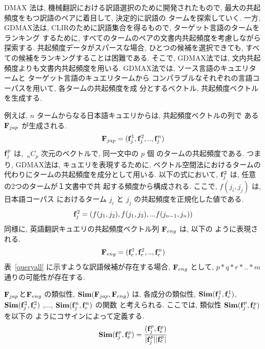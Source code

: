 DMAX 法は, 機械翻訳における訳語選択のために開発されたもので, 
最大の共起頻度をもつ訳語のペアに着目して, 決定的に訳語の
タームを探索していく. 一方, 
GDMAX法は, CLIRのために訳語集合を得るもので, ターゲット言語のタームをランキング
するために, すべてのタームのペアの文書内共起頻度を考慮しながら探索する. 
共起頻度データがスパースな場合, ひとつの候補を選択できても, 
すべての候補をランキングすることは困難である. そこで, GDMAX法では, 
文内共起頻度よりも文書内共起頻度を用いる. 
GDMAX法では, ソース言語のキュエリタームと
ターゲット言語のキュエリタームから
コンパラブルなそれぞれの言語コーパスを用いて, 各タームの共起頻度を成
分とするベクトル, 共起頻度ベクトルを生成する. 

例えば, $n$ タームからなる日本語キュエリからは, 共起頻度ベクトルの列で
ある ${\bf F}_{jap}$ が生成される. 
\begin{eqnarray*}
 {\bf F}_{jap} = ({\bf f}_{j}^{1},{\bf f}_{j}^{2},..,{\bf f}_{j}^{n})
\end{eqnarray*}
${\bf f}_{j}^{p}$ は, $~_{n}C_{p}$ 次元のベクトルで, 同一文中の $p$ 個
のタームの共起頻度である. つまり, GDMAX法は, キュエリを表現するために, 
ベクトル空間法におけるタームの代わりにタームの共起頻度を成分として用いる. 
以下の式において, ${\bf f}_{j}^{2}$ は, 任意の2つのタームが１文書中で共
起する頻度から構成される. ここで, $f(j_{i},j_{j})$ は, 日本語コーパス
におけるターム $j_{i}$ と $j_{j}$ の共起頻度を正規化した値である. 
\begin{eqnarray*}
 {\bf f}_{j}^{2} = (f(j_{1},j_{2}),f(j_{1},j_{3}),...f(j_{n-1},j_{n}))
\end{eqnarray*}
同様に, 英語翻訳キュエリの共起頻度ベクトル列 ${\bf F}_{eng}$ は, 以下の
ように表現される.  
\begin{eqnarray*}
 {\bf F}_{eng} = ({\bf f}_{e}^{1},{\bf f}_{e}^{2},..,{\bf f}_{e}^{n})
\end{eqnarray*}
表~\ref{queryall} に示すような訳語候補が存在する場合, 
${\bf F}_{eng}$ として, $p*q*r*..*m$ 通りの可能性が存在する. 

${\bf F}_{jap}$と${\bf F}_{eng}$ の類似性, ${\bf Sim}({\bf
F}_{jap},{\bf F}_{eng})$ は, 各成分の類似性, ${\bf Sim}({\bf
f}_{j}^{1},{\bf f}_{e}^{1})$,${\bf Sim}({\bf f}_{j}^{2},{\bf
f}_{e}^{2})$ ,..., ${\bf Sim}({\bf f}_{j}^{n},{\bf f}_{e}^{n})$ の関数
と考えられる. 
ここでは, 類似性 ${\bf Sim}({\bf f}_{j}^{p},{\bf f}_{e}^{p})$ を以下の
ようにコサインによって定義する. 
\begin{eqnarray*}
 {\bf Sim}({\bf f}_{j}^{p},{\bf f}_{e}^{p}) =
  \frac{({\bf f}_{j}^{p},{\bf f}_{e}^{p})}{|{\bf f}_{j}^{p}||{\bf f}_{e}^{p}|}
\end{eqnarray*}

